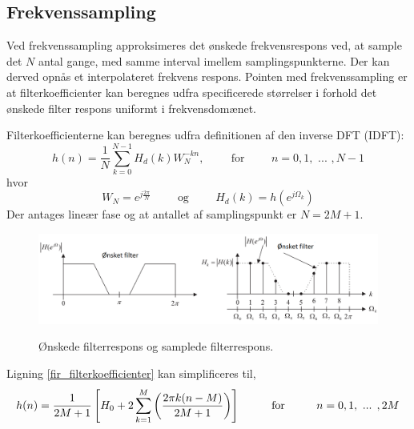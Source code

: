 \subsection{Frekvenssampling}
Ved frekvenssampling approksimeres det ønskede frekvensrespons ved, at sample det $N$ antal gange, med samme interval imellem samplingspunkterne. Der kan derved opnås et interpolateret frekvens respons.
Pointen med frekvenssampling er at filterkoefficienter kan beregnes udfra specificerede størrelser i forhold det ønskede filter respons uniformt i frekvensdomænet.

Filterkoefficienterne kan beregnes udfra definitionen af den inverse DFT (IDFT):
\begin {equation}
h(n)=\frac{1}{N}\sum_{k=0}^{N-1}H_{d}(k)W_{N}^{-kn} ,\hspace{1cm}\text{for}\hspace{1cm} n = 0, 1,\text{ ... }, N-1 \label{fir_filterkoefficienter}
\end {equation}
hvor
\begin {equation}
W_{N}=e^{j\frac{2\pi}{N}} \hspace{1cm}\text{og} \hspace{1cm} H_{d}(k)=h(e^{j\Omega_{k}}) \nonumber
\end {equation}
Der antages lineær fase og at antallet af samplingspunkt er $N=2M+1$.



\begin{figure}[h]
\centering
\includegraphics[width=.90\textwidth]{billeder/fir_frekvenssampling.png}\label{fig:fir_frekvenssampling}
\caption{Ønskede filterrespons og samplede filterrespons.}
\end{figure}
\FloatBlock

Ligning \ref{fir_filterkoefficienter} kan simplificeres til,
\begin {equation}
h(n)=\frac{1}{2M+1}\left[ H_{0}+2\sum_{k=1}^{M} \left( \frac{2\pi k(n-M)}{2M+1} \right) \right] \hspace{1cm} \text{for} \hspace{1 cm} n=0,1,\text{ ... },2M
\end {equation}

